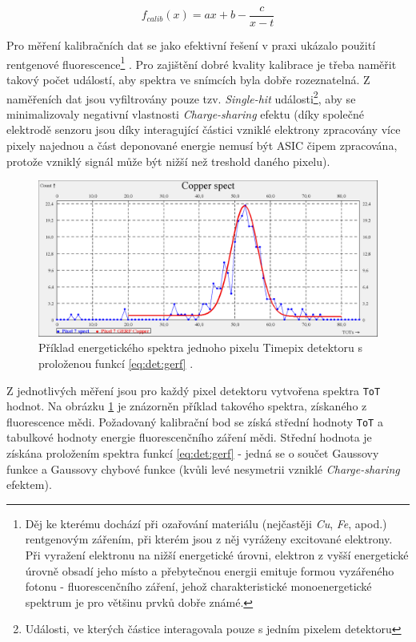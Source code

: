 \begin{equation}\label{eq:det:energyCalib}
	f_{calib}(x) = ax + b - \frac{c}{x-t}
\end{equation}

Pro měření kalibračních dat se jako efektivní řešení v praxi ukázalo použití rentgenové fluorescence\footnote{Děj ke kterému dochází při ozařování materiálu (nejčastěji \textit{Cu}, \textit{Fe},  apod.) rentgenovým zářením, při kterém jsou z něj vyráženy excitované elektrony. Při vyražení elektronu na nižší energetické úrovni, elektron z vyšší energetické úrovně obsadí jeho místo a přebytečnou energii emituje formou vyzářeného fotonu - fluorescenčního záření, jehož charakteristické monoenergetické spektrum je pro většinu prvků dobře známé.} \cite{Jakubek-radiography_and_charge_sharing}. Pro zajištění dobré kvality kalibrace je třeba naměřit takový počet událostí, aby spektra ve snímcích byla dobře rozeznatelná. Z naměřeních dat jsou vyfiltrovány pouze tzv. \textit{Single-hit} události\footnote{Události, ve kterých částice interagovala pouze s jedním pixelem detektoru}, aby se minimalizovaly negativní vlastnosti \textit{Charge-sharing} efektu (díky společné elektrodě senzoru jsou díky interagující částici vzniklé elektrony zpracovány více pixely najednou a část deponované energie nemusí být ASIC čipem zpracována, protože vzniklý signál může být nižší než treshold daného pixelu).

\begin{figure}[th]
	\begin{center}
		\includegraphics[width=15cm]{figures/calib_gerf.png}
		\caption{Příklad energetického spektra jednoho pixelu Timepix detektoru s proloženou funkcí \ref{eq:det:gerf} \cite{BegeraBcThesis2016}.}
		\label{fig:det:calib:gerf}
	\end{center}
\end{figure}

Z jednotlivých měření jsou pro každý pixel detektoru vytvořena spektra \texttt{ToT} hodnot. Na obrázku \ref{fig:det:calib:gerf} je znázorněn příklad takového spektra, získaného z fluorescence mědi. Požadovaný kalibrační bod se získá střední hodnoty \texttt{ToT} a tabulkové hodnoty energie fluorescenčního záření mědi. Střední hodnota je získána proložením spektra funkcí \ref{eq:det:gerf} - jedná se o součet Gaussovy funkce a Gaussovy chybové funkce (kvůli levé nesymetrii vzniklé \textit{Charge-sharing} efektem).

